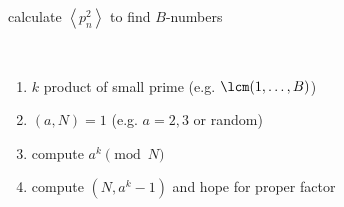 \begin{example}
    calculate $\left< p_n^2 \right>$ to find $B$-numbers
\end{example}

\begin{example}\,
    \begin{enumerate}
        \item $k$ product of small prime (e.g. $\lcm(1, \dots, B)$)
        \item $(a, N) = 1$ (e.g. $a = 2, 3$ or random)
        \item compute $a^k \pmod{N}$
        \item compute $(N, a^k - 1)$ and hope for proper factor
    \end{enumerate}
\end{example}


